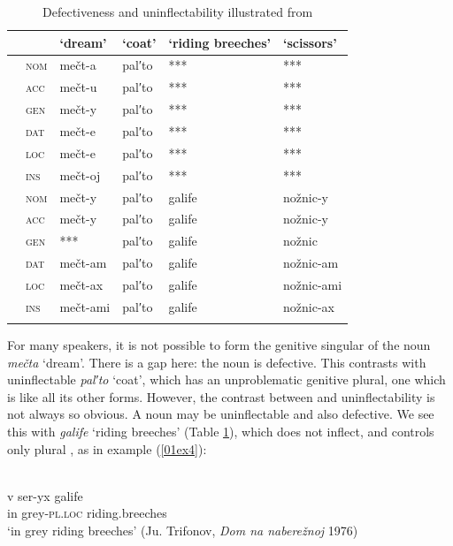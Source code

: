 \documentclass[output=paper,colorlinks,citecolor=brown]{langscibook}
\begin{document}
\begin{table}[ht]
	\centering
	\caption{Defectiveness and uninflectability illustrated from }
	\label{01tab3}
	\begin{tabularx}{\textwidth}{llXXXX}
		\lsptoprule
		&  & ‘dream’ & ‘coat’ & ‘riding breeches’ & ‘scissors’ \\
		\midrule
		\multirow{6}{*}{\rotatebox{90}{\textsc{singular}}} 
		& \textsc{nom} & mečt-a   & pal′to    & ***     & ***	\\
		& \textsc{acc} & mečt-u   & pal′to    & ***     & ***	\\
		& \textsc{gen} & mečt-y   & pal′to    & ***     & ***	\\
		& \textsc{dat} & mečt-e   & pal′to    & ***     & ***	\\
		& \textsc{loc} & mečt-e   & pal′to    & ***     & ***	\\
		& \textsc{ins} & mečt-oj  & pal′to    & ***     & ***	\\
		\midrule
		\multirow{6}{*}{\rotatebox{90}{\textsc{plural}}} 
		& \textsc{nom} & mečt-y   & pal′to    & galife    & nožnic-y	\\
		& \textsc{acc} & mečt-y   & pal′to    & galife    & nožnic-y	\\
		& \textsc{gen} & ***  	  & pal′to    & galife   & nožnic	\\
		& \textsc{dat} & mečt-am  & pal′to    & galife  & nožnic-am	\\
		& \textsc{loc} & mečt-ax  & pal′to    & galife  & nožnic-ami	\\
		& \textsc{ins} & mečt-ami & pal′to    & galife & nožnic-ax	\\
		\lspbottomrule
	\end{tabularx}
\end{table}

For many  speakers, it is not possible to form the genitive singular of the noun \textit{mečta} `dream'. There is a gap here: the noun is defective. This contrasts with uninflectable \textit{pal′to} `coat', which has an unproblematic genitive plural, one which is like all its other forms. However, the contrast between  and uninflectability is not always so obvious. A noun may be uninflectable and also defective. We see this with \textit{galife} `riding breeches' (Table \ref{01tab3}), which does not inflect, and controls only plural , as in example (\ref{01ex4}):

\begin{exe}
	\ex {} \citep[60]{corbett2019} \label{01ex4}\\
	\gll v	ser-yx	galife \\
	in	grey-\textsc{pl.loc}	riding.breeches \\
	\trans ‘in grey riding breeches’ \hfill (Ju. Trifonov, \textit{Dom na naberežnoj} 1976)
\end{exe}
\end{document}
